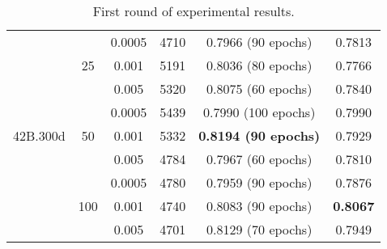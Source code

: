 \begin{table}
\begin{tabular}{@{}|c|c|cccc@{}}
\multirow{9}{*}{42B.300d} & \multirow{3}{*}{25}  & \multicolumn{1}{c|}{0.0005} & \multicolumn{1}{c|}{4710} & \multicolumn{1}{c|}{0.7966 (90 epochs)}          & \multicolumn{1}{c|}{0.7813}          \\ \cmidrule(l){3-6} 
                          &                      & \multicolumn{1}{c|}{0.001}  & \multicolumn{1}{c|}{5191} & \multicolumn{1}{c|}{0.8036 (80 epochs)}          & \multicolumn{1}{c|}{0.7766}          \\ \cmidrule(l){3-6} 
                          &                      & \multicolumn{1}{c|}{0.005}  & \multicolumn{1}{c|}{5320} & \multicolumn{1}{c|}{0.8075 (60 epochs)}          & \multicolumn{1}{c|}{0.7840}          \\ \cmidrule(l){2-6} 
                          & \multirow{3}{*}{50}  & \multicolumn{1}{c|}{0.0005} & \multicolumn{1}{c|}{5439} & \multicolumn{1}{c|}{0.7990 (100 epochs)}         & \multicolumn{1}{c|}{0.7990}          \\ \cmidrule(l){3-6} 
                          &                      & \multicolumn{1}{c|}{0.001}  & \multicolumn{1}{c|}{5332} & \multicolumn{1}{c|}{\textbf{0.8194 (90 epochs)}} & \multicolumn{1}{c|}{0.7929}          \\ \cmidrule(l){3-6} 
                          &                      & \multicolumn{1}{c|}{0.005}  & \multicolumn{1}{c|}{4784} & \multicolumn{1}{c|}{0.7967 (60 epochs)}          & \multicolumn{1}{c|}{0.7810}          \\ \cmidrule(l){2-6} 
                          & \multirow{3}{*}{100} & \multicolumn{1}{c|}{0.0005} & \multicolumn{1}{c|}{4780} & \multicolumn{1}{c|}{0.7959 (90 epochs)}          & \multicolumn{1}{c|}{0.7876}          \\ \cmidrule(l){3-6} 
                          &                      & \multicolumn{1}{c|}{0.001}  & \multicolumn{1}{c|}{4740} & \multicolumn{1}{c|}{0.8083 (90 epochs)}          & \multicolumn{1}{c|}{\textbf{0.8067}} \\ \cmidrule(l){3-6} 
                          &                      & \multicolumn{1}{c|}{0.005}  & \multicolumn{1}{c|}{4701} & \multicolumn{1}{c|}{0.8129 (70 epochs)}          & \multicolumn{1}{c|}{0.7949}          \\ \bottomrule
\end{tabular}
\caption{First round of experimental results.}
\label{tab:results}
\end{table}